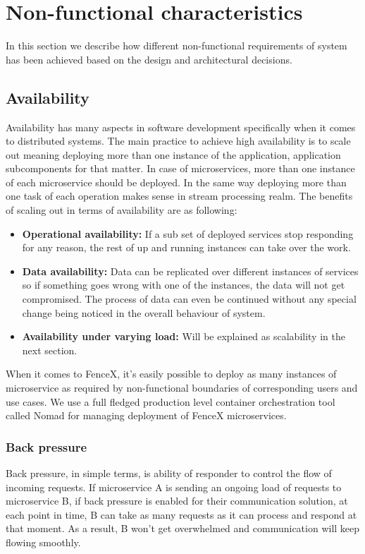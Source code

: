 \documentclass[a4]{report}
\begin{document}
    \section{Non-functional characteristics}
    In this section we describe how different non-functional requirements of system has been achieved based on the
    design and architectural decisions.

    \subsection{Availability}
    Availability has many aspects in software development specifically when it comes to distributed systems.
    The main practice to achieve high availability is to scale out meaning deploying more than one instance of the
    application, application subcomponents for that matter.
    In case of microservices, more than one instance of each microservice should be deployed.
    In the same way deploying more than one task of each operation makes sense in stream processing realm.
    The benefits of scaling out in terms of availability are as following:
    \begin{itemize}
        \item \textbf{Operational availability:} If a sub set of deployed services stop responding for any
        reason, the rest of up and running instances can take over the work.
        \item \textbf{Data availability:} Data can be replicated over different instances of services so if
        something goes wrong with one of the instances, the data will not get compromised.
        The process of data can even be continued without any special change being noticed in the overall behaviour of
        system.
        \item \textbf{Availability under varying load:} Will be explained as scalability in the next section.
    \end{itemize}

    When it comes to FenceX, it's easily possible to deploy as many instances of microservice as required by
    non-functional boundaries of corresponding users and use cases.
    We use a full fledged production level container orchestration tool called Nomad\cite{nomad} for managing deployment of
    FenceX microservices.

    \subsubsection{Back pressure}
    Back pressure\cite{reactive-manifesto}, in simple terms, is ability of responder to control the flow of incoming requests.
    If microservice A is sending an ongoing load of requests to microservice B, if back pressure is enabled for
    their communication solution, at each point in time, B can take as many requests as it can process and respond at
    that moment.
    As a result, B won't get overwhelmed and communication will keep flowing smoothly.
\end{document}
